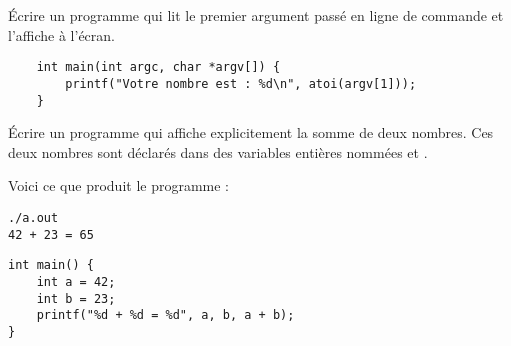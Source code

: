 \documentclass[french,a4paper,addpoints,11pt]{exam}
\begin{document}
\begin{questions}

\question Écrire un programme qui lit le premier argument passé en ligne de commande et l'affiche à l'écran.

\ifprintanswers
\begin{solution}
    \begin{lstlisting}
    int main(int argc, char *argv[]) {
        printf("Votre nombre est : %d\n", atoi(argv[1]));
    }
    \end{lstlisting}
\end{solution}
\else
\fillwithdottedlines{4cm}
\fi

\question Écrire un programme qui affiche explicitement la somme de deux nombres. 
Ces deux nombres sont déclarés dans des variables entières nommées  et . 

Voici ce que produit le programme :

\begin{lstlisting}
./a.out 
42 + 23 = 65
\end{lstlisting}

\ifprintanswers
\begin{solution}
\begin{lstlisting}
int main() {
    int a = 42;
    int b = 23;
    printf("%d + %d = %d", a, b, a + b);
}
\end{lstlisting}
\end{solution}
\else
\fillwithdottedlines{4cm}
\fi

\end{questions}
\end{document}
